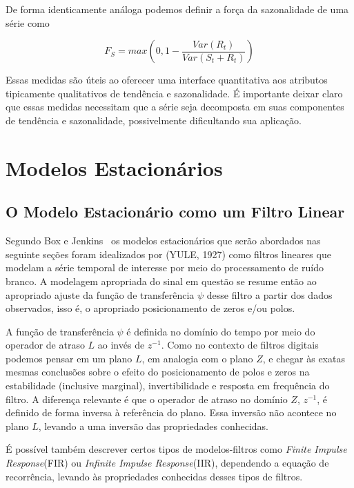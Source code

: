 De forma identicamente análoga podemos definir a força da sazonalidade de uma
série como

$$ F_S = max\left(0, 1 - \frac{Var(R_t)}{Var(S_t + R_t)}\right) $$

Essas medidas são úteis ao oferecer uma interface quantitativa aos atributos
tipicamente qualitativos de tendência e sazonalidade. É importante deixar
claro que essas medidas necessitam que a série seja decomposta em suas
componentes de tendência e sazonalidade, possivelmente dificultando sua
aplicação.

\section{Modelos Estacionários}

\subsection{O Modelo Estacionário como um Filtro Linear}

Segundo Box e Jenkins~\cite[capítulo~1.2.1]{box} os modelos estacionários que
serão abordados nas seguinte seções foram idealizados por (YULE, 1927) como
filtros lineares que modelam a série temporal de interesse por meio do
processamento de ruído branco. A modelagem apropriada do sinal em questão se
resume então ao apropriado ajuste da função de transferência $\psi$ desse
filtro a partir dos dados observados, isso é, o apropriado posicionamento de
zeros e/ou polos.

A função de transferência $\psi$ é definida no domínio do tempo por meio do
operador de atraso $L$ ao invés de $z^{-1}$. Como no contexto de filtros
digitais podemos pensar em um plano $L$, em analogia com o plano $Z$, e chegar às
exatas mesmas conclusões sobre o efeito do posicionamento de polos e zeros na
estabilidade (inclusive marginal), invertibilidade e resposta em frequência do
filtro. A diferença relevante é que o operador de atraso no domínio $Z$,
$z^{-1}$, é definido de forma inversa à referência do plano. Essa inversão não
acontece no plano $L$, levando a uma inversão das propriedades conhecidas.

É possível também descrever certos tipos de modelos-filtros como \emph{Finite
Impulse Response}(FIR) ou \emph{Infinite Impulse Response}(IIR), dependendo
a equação de recorrência, levando às propriedades conhecidas desses tipos de
filtros.

